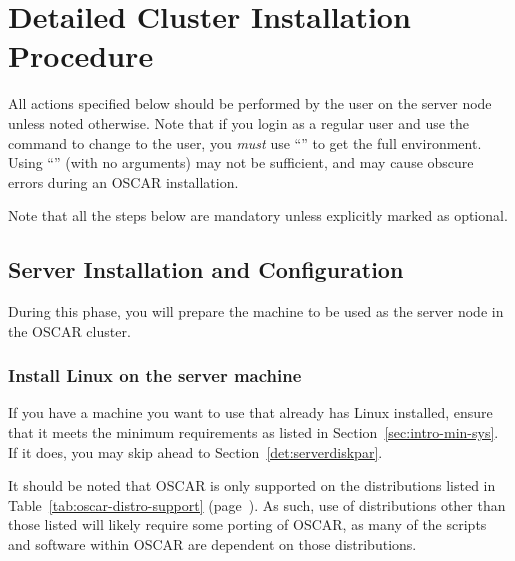 %
% 
%
%
%

\section{Detailed Cluster Installation Procedure}
\label{sec:detail}

All actions specified below should be performed by the 
user on the server node unless noted otherwise.  Note that if you
login as a regular user and use the  command to change to the
 user, you {\em must} use ``'' to get the full
 environment.  Using ``'' (with no arguments) may
not be sufficient, and may cause obscure errors during an OSCAR
installation.

Note that all the steps below are mandatory unless explicitly marked
as optional.


\subsection{Server Installation and Configuration}
\label{det:serverinstall}
  
During this phase, you will prepare the machine to be used as the
server node in the OSCAR cluster.


\subsubsection{Install Linux on the server machine} 
\label{det:serverosinstall}

If you have a machine you want to use that already has Linux
installed, ensure that it meets the minimum requirements as listed in
Section~\ref{sec:intro-min-sys}.  If it does, you may skip ahead to
Section~\ref{det:serverdiskpar}.

It should be noted that OSCAR is only supported on the distributions
listed in Table~\ref{tab:oscar-distro-support}
(page~\pageref{tab:oscar-distro-support}).  As such, use of
distributions other than those listed will likely require some porting
of OSCAR, as many of the scripts and software within OSCAR are
dependent on those distributions. 

